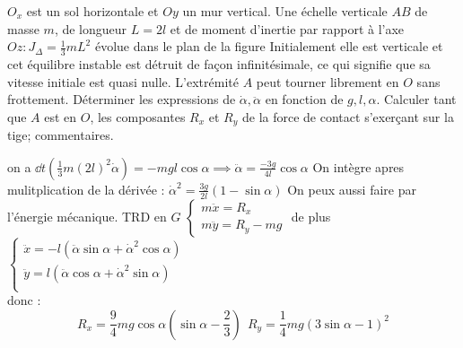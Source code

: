 \begin{Exercise}[title=Chute d'échelle]
	$O_x$ est un sol horizontale et $Oy$ un mur vertical. Une échelle verticale $AB$ de masse $m$, de longueur $L=2l$ et de moment d'inertie par rapport à l'axe $Oz: J_\Delta =\frac{1}{3}mL^2$ évolue dans le plan de la figure Initialement elle est verticale et cet équilibre instable est détruit de façon infinitésimale, ce qui signifie que sa vitesse initiale est quasi nulle.
	L'extrémité $A$ peut tourner librement en $O$ sans frottement.
	\Question Déterminer les expressions de $\dot{\alpha},\ddot{\alpha}$ en fonction de $g,l,\alpha$.
	\Question Calculer tant que $A$ est en $O$, les composantes $R_x$ et $R_y$ de la force de contact s'exerçant sur la tige; commentaires.
\end{Exercise}
\begin{Answer}
	\Question on a $\dd{}{t}\left(\frac{1}{3}m(2l)^2\dot{\alpha}\right) = -mgl\cos \alpha \implies \boxed{\ddot{\alpha} = \frac{-3g}{4l}\cos\alpha}$
On intègre apres mulitplication de la dérivée : $\dot{\alpha}^2=\frac{3g}{2l}(1-\sin\alpha)$
On peux aussi faire par l'énergie mécanique.
	\Question TRD en $G$
	$ \begin{cases}
	m\ddot{x} =R_x \\
	m\ddot{y} =R_y-mg
	\end{cases} $ de plus $\begin{cases}
	\ddot{x} = -l(\ddot{\alpha}\sin\alpha +\dot{\alpha}^2\cos\alpha)\\
	\ddot{y} = l(\ddot{\alpha}\cos\alpha +\dot{\alpha}^2\sin\alpha)\\
	\end{cases}$ \\
	donc :
	\[ \boxed{R_x = \frac{9}{4}mg\cos\alpha\left(\sin\alpha -\frac{2}{3}\right)} ~ ~ \boxed{R_y= \frac{1}{4}mg\left(3\sin\alpha-1\right)^2} \]
\end{Answer}
